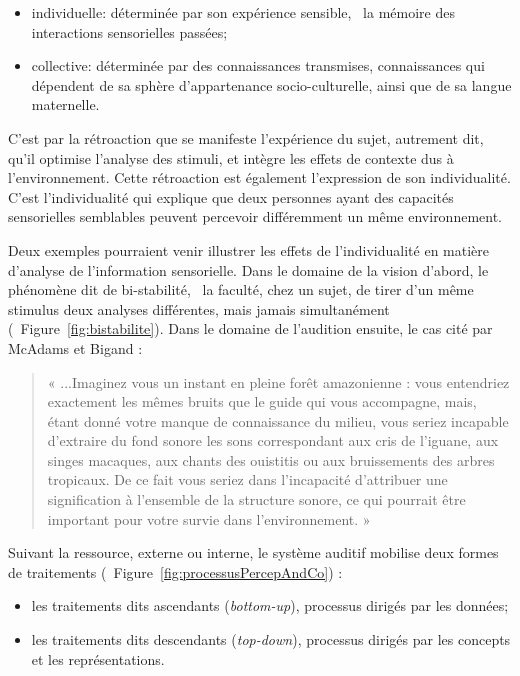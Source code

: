 \begin{itemize}
\item individuelle: déterminée par son expérience sensible, \ie~la mémoire des interactions sensorielles passées;
\item collective: déterminée par des connaissances transmises, connaissances qui dépendent de sa sphère d'appartenance socio-culturelle, ainsi que de sa langue maternelle.
\end{itemize}

C'est par la rétroaction que se manifeste l'expérience du sujet, autrement dit, qu'il optimise l'analyse des stimuli, et intègre les effets de contexte dus à l'environnement. Cette rétroaction est également l'expression de son individualité. C'est l'individualité qui explique que deux personnes ayant des capacités sensorielles semblables peuvent percevoir différemment un même environnement. 

Deux exemples pourraient venir illustrer les effets de l'individualité en matière d'analyse de l'information sensorielle. Dans le domaine de la vision d'abord, le phénomène dit de bi-stabilité, \ie~la faculté, chez un sujet, de tirer d'un même stimulus deux analyses différentes, mais jamais simultanément \citep{schwartz2012multistability} (\cf~Figure~\ref{fig:bistabilite}). Dans le domaine de l'audition ensuite, le cas cité par McAdams et Bigand \citep[p. 2]{mcadams1994penser}:

\begin{quote}
« ...Imaginez vous un instant en pleine forêt amazonienne : vous entendriez exactement les mêmes bruits que le guide qui vous accompagne, mais, étant donné votre manque de connaissance du milieu, vous seriez incapable d'extraire du fond sonore les sons correspondant aux cris de l'iguane, aux singes macaques, aux chants des ouistitis ou aux bruissements des arbres tropicaux. De ce fait vous seriez dans l'incapacité d'attribuer une signification à l'ensemble de la structure sonore, ce qui pourrait être important pour votre survie dans l'environnement. »
\end{quote}


Suivant la ressource, externe ou interne, le système auditif mobilise deux formes de traitements (\cf~Figure~\ref{fig:processusPercepAndCo}) :

\begin{itemize}
\item les traitements dits ascendants (\emph{bottom-up}), processus dirigés par les données;
\item les traitements dits descendants (\emph{top-down}), processus dirigés par les concepts et les représentations.
\end{itemize}

